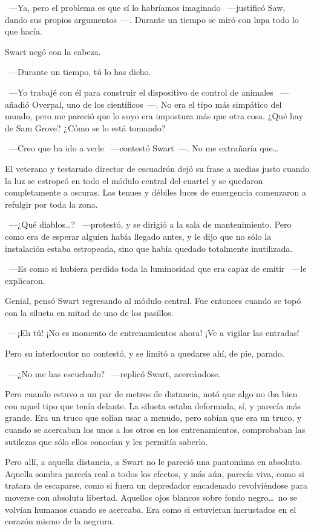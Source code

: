 ~---Ya, pero el problema es que sí lo habríamos imaginado ~---justificó Saw, dando sus propios argumentos~---. Durante un tiempo se miró con lupa todo lo que hacía.

Swart negó con la cabeza.

~---Durante un tiempo, tú lo has dicho.

~---Yo trabajé con él para construir el dispositivo de control de animales ~---añadió Overpal, uno de los científicos~---. No era el tipo más simpático del mundo, pero me pareció que lo suyo era impostura más que otra cosa. ¿Qué hay de Sam Grove? ¿Cómo se lo está tomando?

~---Creo que ha ido a verle ~---contestó Swart~---. No me extrañaría que\dots

El veterano y testarudo director de escuadrón dejó su frase a medias justo cuando la luz se estropeó en todo el módulo central del cuartel y se quedaron completamente a oscuras. Las tenues y débiles luces de emergencia comenzaron a refulgir por toda la zona.

~---¿Qué diablos\dots? ~---protestó, y se dirigió a la sala de mantenimiento. Pero como era de esperar alguien había llegado antes, y le dijo que no sólo la instalación estaba estropeada, sino que había quedado totalmente inutilizada.

~---Es como si hubiera perdido toda la luminosidad que era capaz de emitir ~---le explicaron.

Genial, pensó Swart regresando al módulo central. Fue entonces cuando se topó con la silueta en mitad de uno de los pasillos.

~---¡Eh tú! ¡No es momento de entrenamientos ahora! ¡Ve a vigilar las entradas!

Pero su interlocutor no contestó, y se limitó a quedarse ahí, de pie, parado.

~---¿No me has escuchado? ~---replicó Swart, acercándose.

Pero cuando estuvo a un par de metros de distancia, notó que algo no iba bien con aquel tipo que tenía delante. La silueta estaba deformada, sí, y parecía más grande. Era un truco que solían usar a menudo, pero sabían que era un truco, y cuando se acercaban los unos a los otros en los entrenamientos, comprobaban las sutilezas que sólo ellos conocían y les permitía saberlo.

Pero allí, a aquella distancia, a Swart no le pareció una pantomima en absoluto. Aquella sombra parecía real a todos los efectos, y más aún, parecía viva, como si tratara de escaparse, como si fuera un depredador encadenado revolviéndose para moverse con absoluta libertad. Aquellos ojos blancos sobre fondo negro\dots\ no se volvían humanos cuando se acercaba. Era como si estuvieran incrustados en el corazón mismo de la negrura.

